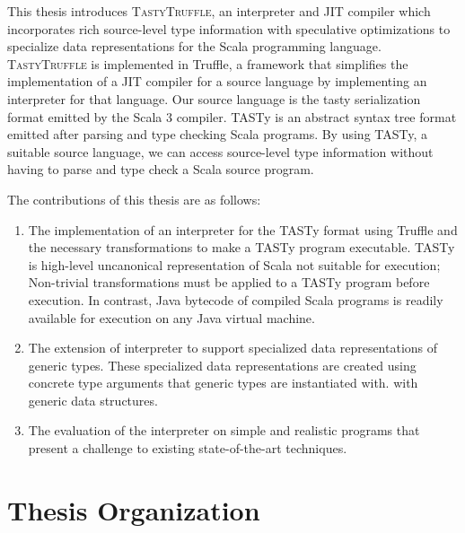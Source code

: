 This thesis introduces \textsc{TastyTruffle}, an interpreter and JIT compiler which incorporates rich source-level type information with speculative optimizations to specialize data representations for the Scala programming language.
\textsc{TastyTruffle} is implemented in Truffle, a framework that simplifies the implementation of a JIT compiler for a source language by implementing an interpreter for that language. 
Our source language is the \acrfull{tasty} serialization format emitted by the Scala 3 compiler.
TASTy is an abstract syntax tree format emitted after parsing and type checking Scala programs.
By using TASTy, a suitable source language, we can access source-level type information without having to parse and type check a Scala source program.

The contributions of this thesis are as follows: 
\begin{enumerate}
	\item The implementation of an interpreter for the TASTy format using Truffle and the necessary transformations to make a TASTy program executable. TASTy is high-level uncanonical representation of Scala not suitable for execution; Non-trivial transformations must be applied to a TASTy program before execution.
	In contrast, Java bytecode of compiled Scala programs is readily available for execution on any Java virtual machine.
	\item The extension of interpreter to support specialized data representations of generic types.
	These specialized data representations are created using concrete type arguments that generic types are instantiated with.
	with generic data structures.
	\item The evaluation of the interpreter on simple and realistic programs that present a challenge to existing state-of-the-art techniques.
\end{enumerate}

\newpage

\section{Thesis Organization}


